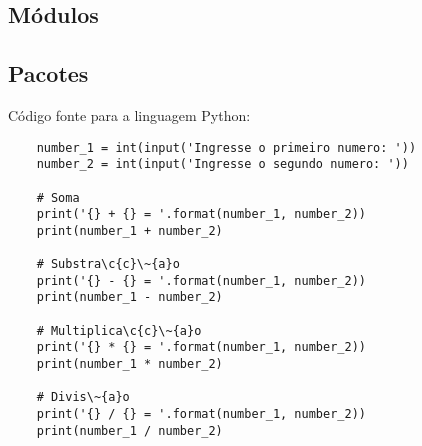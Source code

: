             \subsection{Módulos}



            \subsection{Pacotes}






    Código fonte para a linguagem Python:
    \begin{lstlisting}
    number_1 = int(input('Ingresse o primeiro numero: '))
    number_2 = int(input('Ingresse o segundo numero: '))

    # Soma
    print('{} + {} = '.format(number_1, number_2))
    print(number_1 + number_2)

    # Substra\c{c}\~{a}o
    print('{} - {} = '.format(number_1, number_2))
    print(number_1 - number_2)

    # Multiplica\c{c}\~{a}o
    print('{} * {} = '.format(number_1, number_2))
    print(number_1 * number_2)

    # Divis\~{a}o
    print('{} / {} = '.format(number_1, number_2))
    print(number_1 / number_2)
    \end{lstlisting}





